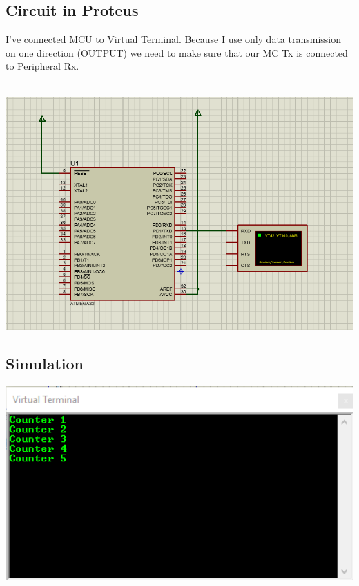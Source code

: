 \subsection{Circuit in Proteus}
I've connected MCU to Virtual Terminal. Because I use only data transmission on one direction (OUTPUT) we need to make sure that our MC Tx is connected to Peripheral Rx.\\\\
\centerline{
	\includegraphics[width=1.0\textwidth]{solution/images/schematics.png}
}

\subsection{Simulation}
\centerline{
	\includegraphics[width=1.0\textwidth]{solution/images/result.png}
}

